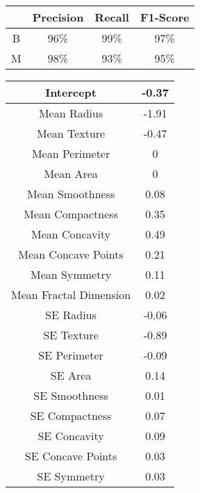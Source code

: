 \documentclass[conference]{IEEEtran}
\begin{document}
\begin{table*}
        \centering
        \caption{Classification Report for Testing Data}
        \begin{tabular}{c|c|c|c}
             & Precision & Recall & F1-Score\\
             \hline
             B & 96\% & 99\% & 97\%\\
             \hline
             M & 98\% & 93\% & 95\%
        \end{tabular}

       \caption{\\Intercept and Coefficients for Each Feature}
        \begin{tabular}{c|c}
             Intercept & -0.37\\
             \hline
             Mean Radius & -1.91\\
             \hline
             Mean Texture & -0.47\\
             \hline
             Mean Perimeter & 0\\
             \hline
             Mean Area & 0\\
             \hline
             Mean Smoothness & 0.08\\
             \hline
             Mean Compactness & 0.35\\
             \hline
             Mean Concavity & 0.49\\
             \hline
             Mean Concave Points & 0.21\\
             \hline
             Mean Symmetry & 0.11\\
             \hline
             Mean Fractal Dimension & 0.02\\
             \hline
             SE Radius & -0.06\\
             \hline
             SE Texture & -0.89\\
             \hline
             SE Perimeter & -0.09\\
             \hline
             SE Area & 0.14\\
             \hline
             SE Smoothness & 0.01\\
             \hline
             SE Compactness & 0.07\\
             \hline
             SE Concavity & 0.09\\
             \hline
             SE Concave Points & 0.03\\
             \hline
             SE Symmetry & 0.03\\

\end{tabular}
\end{table*}
\end{document}
